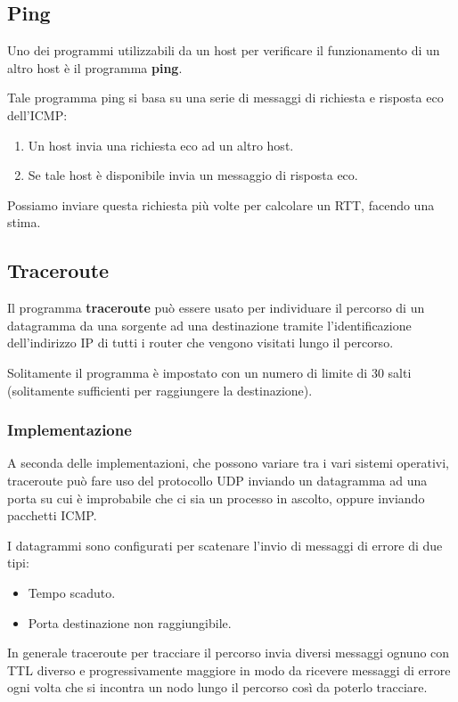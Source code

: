 \subsection{Ping}
Uno dei programmi utilizzabili da un host per verificare il 
funzionamento di un altro host è il programma \textbf{ping}.

Tale programma ping si basa su una serie di messaggi di richiesta
e risposta eco dell'ICMP:
\begin{enumerate}
	\item Un host invia una richiesta eco ad un altro host.
	\item Se tale host è disponibile invia un messaggio di risposta
		eco.
\end{enumerate}
Possiamo inviare questa richiesta più volte per calcolare un RTT,
facendo una stima.

\subsection{Traceroute}
Il programma \textbf{traceroute} può essere usato per individuare
il percorso di un datagramma da una sorgente ad una destinazione
tramite l'identificazione dell'indirizzo IP di tutti i router che
vengono visitati lungo il percorso.

Solitamente il programma è impostato con un numero di limite di 30
salti (solitamente sufficienti per raggiungere la destinazione).

\subsubsection{Implementazione}
A seconda delle implementazioni, che possono variare tra i vari sistemi
operativi, traceroute può fare uso del protocollo UDP inviando un 
datagramma ad una porta su cui è improbabile che ci sia un processo in 
ascolto, oppure inviando pacchetti ICMP.

I datagrammi sono configurati per scatenare l'invio di messaggi di 
errore di due tipi:
\begin{itemize}
	\item Tempo scaduto.
	\item Porta destinazione non raggiungibile.
\end{itemize}
In generale traceroute per tracciare il percorso invia diversi messaggi
ognuno con TTL diverso e progressivamente maggiore in modo da ricevere
messaggi di errore ogni volta che si incontra un nodo lungo il percorso
così da poterlo tracciare.
